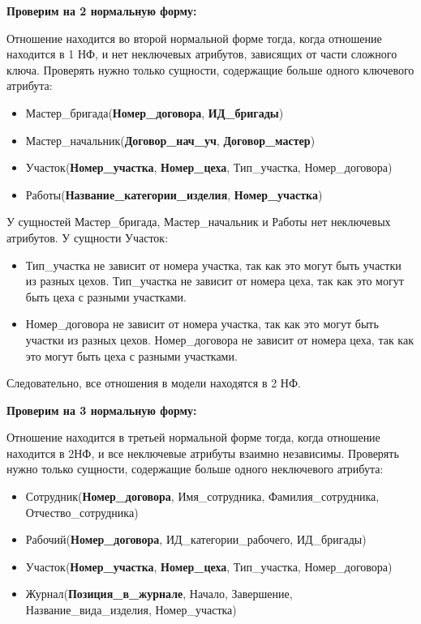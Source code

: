 {\bf Проверим на 2 нормальную форму:}

Отношение находится во второй нормальной форме тогда, когда отношение находится в 1 НФ, и нет неключевых атрибутов, зависящих от части сложного ключа.
Проверять нужно только сущности, содержащие больше одного ключевого атрибута:

\begin{itemize}

    \item Мастер\_бригада({\bf Номер\_договора}, {\bf ИД\_бригады})
    \item Мастер\_начальник({\bf Договор\_нач\_уч}, {\bf Договор\_мастер})
    \item Участок({\bf Номер\_участка}, {\bf Номер\_цеха}, Тип\_участка, Номер\_договора)
    \item Работы({\bf Название\_категории\_изделия}, {\bf Номер\_участка})

\end{itemize}

У сущностей Мастер\_бригада, Мастер\_начальник и Работы нет неключевых атрибутов.
У сущности Участок:
\begin{itemize}

    \item Тип\_участка не зависит от номера участка, так как это могут быть участки из разных цехов.
    Тип\_участка не зависит от номера цеха, так как это могут быть цеха с разными участками.
    \item Номер\_договора не зависит от номера участка, так как это могут быть участки из разных цехов.
    Номер\_договора не зависит от номера цеха, так как это могут быть цеха с разными участками.

\end{itemize}

Следовательно, все отношения в модели находятся в 2 НФ.

{\bf Проверим на 3 нормальную форму:}

Отношение находится в третьей нормальной форме тогда, когда отношение находится в 2НФ, и все неключевые атрибуты взаимно независимы.
Проверять нужно только сущности, содержащие больше одного неключевого атрибута:

\begin{itemize}

    \item Сотрудник({\bf Номер\_договора}, Имя\_сотрудника, Фамилия\_сотрудника, Отчество\_сотрудника)
    \item Рабочий({\bf Номер\_договора}, ИД\_категории\_рабочего, ИД\_бригады)
    \item Участок({\bf Номер\_участка}, {\bf Номер\_цеха}, Тип\_участка, Номер\_договора)
    \item Журнал({\bf Позиция\_в\_журнале}, Начало, Завершение, Название\_вида\_изделия, Номер\_участка)
\end{itemize}

